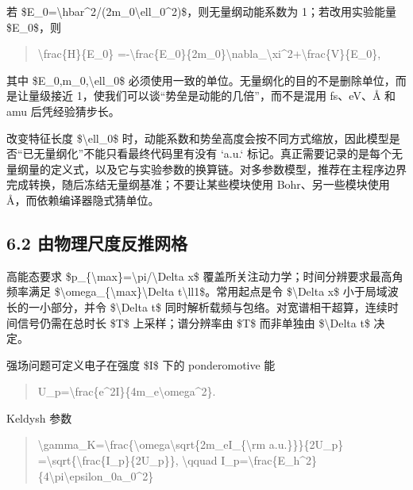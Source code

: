 \documentclass[UTF8,openany,11pt,fontset=fandol]{ctexbook}
\begin{document}
若
\$E\_0=\textbackslash hbar\^{}2/(2m\_0\textbackslash ell\_0\^{}2)\$，则无量纲动能系数为
1；若改用实验能量 \$E\_0\$，则

\begin{quote}
\textbackslash frac\{H\}\{E\_0\}
=-\textbackslash frac\{E\_0\}\{2m\_0\}\textbackslash nabla\_\textbackslash xi\^{}2+\textbackslash frac\{V\}\{E\_0\},
\end{quote}

其中 \$E\_0,m\_0,\textbackslash ell\_0\$
必须使用一致的单位。无量纲化的目的不是删除单位，而是让量级接近
1，使我们可以谈``势垒是动能的几倍''，而不是混用 fs、eV、Å 和 amu
后凭经验猜步长。

改变特征长度 \$\textbackslash ell\_0\$
时，动能系数和势垒高度会按不同方式缩放，因此模型是否``已无量纲化''不能只看最终代码里有没有
`a.u.`
标记。真正需要记录的是每个无量纲量的定义式，以及它与实验参数的换算链。对多参数模型，推荐在主程序边界完成转换，随后冻结无量纲基准；不要让某些模块使用
Bohr、另一些模块使用 Å，而依赖编译器隐式猜单位。

\subsection{\texorpdfstring{\textbf{6.2
由物理尺度反推网格}}{6.2 由物理尺度反推网格}}\label{ux7531ux7269ux7406ux5c3aux5ea6ux53cdux63a8ux7f51ux683c}

高能态要求
\$p\_\{\textbackslash max\}=\textbackslash pi/\textbackslash Delta x\$
覆盖所关注动力学；时间分辨要求最高角频率满足
\$\textbackslash omega\_\{\textbackslash max\}\textbackslash Delta
t\textbackslash ll1\$。常用起点是令 \$\textbackslash Delta x\$
小于局域波长的一小部分，并令 \$\textbackslash Delta t\$
同时解析载频与包络。对宽谱相干超算，连续时间信号仍需在总时长 \$T\$
上采样；谱分辨率由 \$T\$ 而非单独由 \$\textbackslash Delta t\$ 决定。

强场问题可定义电子在强度 \$I\$ 下的 ponderomotive 能

\begin{quote}
U\_p=\textbackslash frac\{e\^{}2I\}\{4m\_e\textbackslash omega\^{}2\}.
\end{quote}

Keldysh 参数

\begin{quote}
\textbackslash gamma\_K=\textbackslash frac\{\textbackslash omega\textbackslash sqrt\{2m\_eI\_\{\textbackslash rm
a.u.\}\}\}\{2U\_p\}
=\textbackslash sqrt\{\textbackslash frac\{I\_p\}\{2U\_p\}\},
\textbackslash qquad
I\_p=\textbackslash frac\{E\_h\^{}2\}\{4\textbackslash pi\textbackslash epsilon\_0a\_0\^{}2\}
\end{quote}
\end{document}
